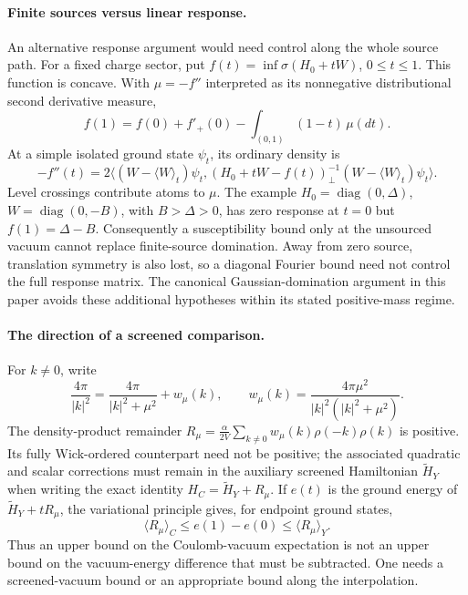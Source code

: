 \paragraph{Finite sources versus linear response.}
An alternative response argument would need control along the whole
source path.  For a fixed charge sector, put
$f(t)=\inf\sigma(H_0+tW)$, $0\leq t\leq1$.  This function is concave.
With $\mu=-f''$ interpreted as its nonnegative distributional second
derivative measure,
\begin{equation}
 f(1)=f(0)+f'_+(0)-\int_{(0,1)}(1-t)\,\mu(dt).
 \label{context:response-path}
\end{equation}
At a simple isolated ground state $\psi_t$, its ordinary density is
\[
 -f''(t)=2\big\langle (W-\langle W\rangle_t)\psi_t,
 (H_0+tW-f(t))^{-1}_{\perp}
 (W-\langle W\rangle_t)\psi_t\big\rangle.
\]
Level crossings contribute atoms to $\mu$.  The example
$H_0=\operatorname{diag}(0,\Delta)$,
$W=\operatorname{diag}(0,-B)$, with $B>\Delta>0$, has zero response at
$t=0$ but $f(1)=\Delta-B$.  Consequently a susceptibility bound only at
the unsourced vacuum cannot replace finite-source domination.  Away
from zero source, translation symmetry is also lost, so a diagonal
Fourier bound need not control the full response matrix.  The canonical
Gaussian-domination argument in this paper avoids these additional
hypotheses within its stated positive-mass regime.

\paragraph{The direction of a screened comparison.}
For $k\ne0$, write
\[
 \frac{4\pi}{|k|^2}=\frac{4\pi}{|k|^2+\mu^2}+w_\mu(k),\qquad
 w_\mu(k)=\frac{4\pi\mu^2}{|k|^2(|k|^2+\mu^2)}.
\]
The density-product remainder
$R_\mu=\frac{\alpha}{2V}\sum_{k\ne0}w_\mu(k)\rho(-k)\rho(k)$
is positive.  Its fully Wick-ordered counterpart need not be positive;
the associated quadratic and scalar corrections must remain in the
auxiliary screened Hamiltonian $\widetilde H_Y$ when writing the exact
identity $H_C=\widetilde H_Y+R_\mu$.  If $e(t)$ is the ground energy of
$\widetilde H_Y+tR_\mu$, the variational principle gives, for endpoint
ground states,
\begin{equation}
 \langle R_\mu\rangle_C\leq e(1)-e(0)
 \leq\langle R_\mu\rangle_Y.
 \label{context:screen-direction}
\end{equation}
Thus an upper bound on the Coulomb-vacuum expectation is not an upper
bound on the vacuum-energy difference that must be subtracted.  One
needs a screened-vacuum bound or an appropriate bound along the
interpolation.

